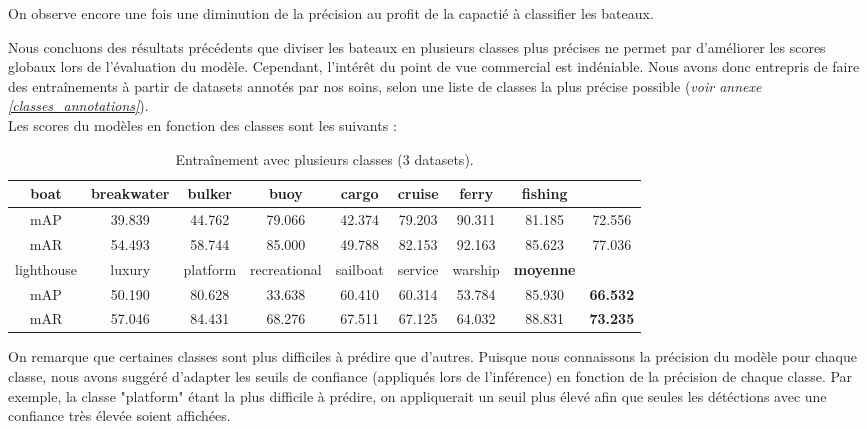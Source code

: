 On observe encore une fois une diminution de la précision au profit de la capactié à classifier
les bateaux.

Nous concluons des résultats précédents que diviser les bateaux en plusieurs classes plus précises
ne permet par d'améliorer les scores globaux lors de l'évaluation du modèle. Cependant,
l'intérêt du point de vue commercial est indéniable. Nous avons donc entrepris de faire des
entraînements à partir de datasets annotés par nos soins, selon une liste de classes
la plus précise possible (\textit{voir annexe \ref{classes_annotations}}).\\

Les scores du modèles en fonction des classes sont les suivants : \\

\begin{table}[H]
    \begin{center}
        \begin{tabular}{c c c c c c c c c}
            \hline
            boat & breakwater & bulker & buoy & cargo & cruise & ferry & fishing \\
            \hline
                mAP & 39.839 & 44.762 & 79.066 & 42.374 & 79.203 & 90.311 & 81.185 & 72.556 \\
                mAR & 54.493 & 58.744 & 85.000 & 49.788 & 82.153 & 92.163 & 85.623 & 77.036 \\
            \hline
            lighthouse & luxury & platform & recreational & sailboat & service & warship & \textbf{moyenne} \\
            \hline
                mAP & 50.190 & 80.628 & 33.638 & 60.410 & 60.314 & 53.784 & 85.930 & \textbf{66.532 }\\
                mAR & 57.046 & 84.431 & 68.276 & 67.511 & 67.125 & 64.032 & 88.831 & \textbf{73.235 }\\
        \end{tabular}
    \end{center}
    \caption{Entraînement avec plusieurs classes (3 datasets).}
\end{table}

On remarque que certaines classes sont plus difficiles à prédire que d'autres.
Puisque nous connaissons la précision du modèle pour chaque classe, nous avons suggéré d'adapter les
seuils de confiance (appliqués lors de l'inférence) en fonction de la précision de chaque classe.
Par exemple, la classe "platform" étant la plus difficile à prédire, on appliquerait un seuil plus élevé afin
que seules les détéctions avec une confiance très élevée soient affichées.

